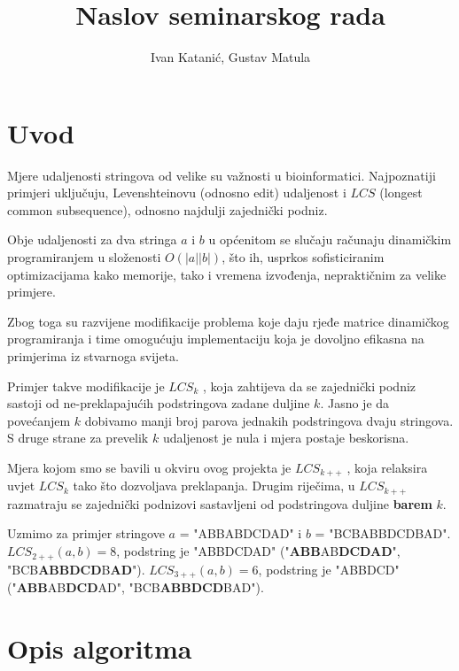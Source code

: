 \documentclass[times, utf8, seminar, numeric]{fer}
\begin{document}
\nocite{*}

\title{Naslov seminarskog rada}

\author{Ivan Katanić, Gustav Matula}


\maketitle

\tableofcontents

\chapter{Uvod}
Mjere udaljenosti stringova od velike su važnosti u bioinformatici.
Najpoznatiji primjeri uključuju, Levenshteinovu (odnosno edit)
udaljenost i $LCS$ (longest common subsequence), odnosno najdulji
zajednički podniz.

Obje udaljenosti za dva stringa $a$ i $b$ u općenitom se slučaju
računaju dinamičkim programiranjem u složenosti $O(|a||b|)$, što ih,
usprkos sofisticiranim optimizacijama kako memorije, tako i vremena
izvođenja, nepraktičnim za velike primjere.

Zbog toga su razvijene modifikacije problema koje daju rjeđe matrice
dinamičkog programiranja i time omogućuju implementaciju koja je 
dovoljno efikasna na primjerima iz stvarnoga svijeta.

Primjer takve modifikacije je $LCS_k$ \cite{Benson}, koja zahtijeva da
se zajednički podniz sastoji od ne-preklapajućih podstringova
zadane duljine $k$. Jasno je da povećanjem $k$ dobivamo manji
broj parova jednakih podstringova dvaju stringova. S druge strane
za prevelik $k$ udaljenost je nula i mjera postaje beskorisna.

Mjera kojom smo se bavili u okviru ovog projekta je $LCS_{k++}$
\cite{Pavetic}, koja relaksira uvjet $LCS_k$ tako što dozvoljava
preklapanja. Drugim riječima, u $LCS_{k++}$ razmatraju se zajednički
podnizovi sastavljeni od podstringova duljine \textbf{barem} $k$.

Uzmimo za primjer stringove $a$ = "ABBABDCDAD" i $b$ = "BCBABBDCDBAD".
$LCS_{2++}(a,b) = 8$, podstring je "ABBDCDAD"
("\textbf{ABB}AB\textbf{DCDAD}", "BCB\textbf{ABBDCD}B\textbf{AD}").
$LCS_{3++}(a,b) = 6$, podstring je "ABBDCD"
("\textbf{ABB}AB\textbf{DCD}AD", "BCB\textbf{ABBDCD}BAD").

\chapter{Opis algoritma}
\end{document}
